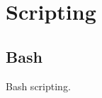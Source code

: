 \documentclass[aspectratio=169]{beamer}
\begin{document}
\begin{frame}
\begin{columns}
\begin{column}{0.5\textwidth}
\begin{figure}
            \end{figure}
        \end{column}
    \end{columns}
\end{frame}



\section{Scripting}



\subsection{Bash}



\begin{frame}
    Bash scripting.
\end{frame}
\end{document}
